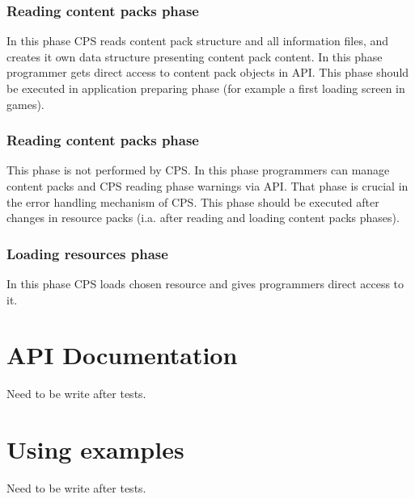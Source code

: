 \documentclass[a4paper]{report}
\begin{document}
\subsection{Reading content packs phase}
In this phase CPS reads content pack structure and all information files, and creates it own data structure presenting content pack content. In this phase programmer gets direct access to content pack objects in API. This phase should be executed in application preparing phase (for example a first loading screen in games).

\subsection{Reading content packs phase}
This phase is not performed by CPS. In this phase programmers can manage content packs and CPS reading phase warnings via API. That phase is crucial in the error handling mechanism of CPS. This phase should be executed after changes in resource packs (i.a. after reading and loading content packs phases).

\subsection{Loading resources phase}
In this phase CPS loads chosen resource and gives programmers direct access to it.

\chapter{API Documentation}
Need to be write after tests.

\chapter{Using examples}
Need to be write after tests.
\end{document}
